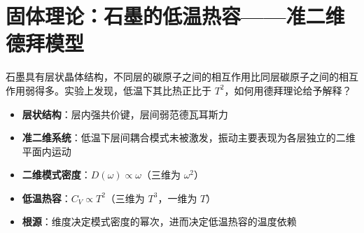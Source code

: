 \section{固体理论：石墨的低温热容——准二维德拜模型}
\label{sec:graphite-2d-debye}

\begin{modelbox}[题目：石墨低温比热与德拜理论]
石墨具有层状晶体结构，不同层的碳原子之间的相互作用比同层碳原子之间的相互作用弱得多。实验上发现，低温下其比热正比于 $T^2$，如何用德拜理论给予解释？
\end{modelbox}

\begin{tipbox}[考点快速分析]
\begin{itemize}
    \item \textbf{层状结构}：层内强共价键，层间弱范德瓦耳斯力
    \item \textbf{准二维系统}：低温下层间耦合模式未被激发，振动主要表现为各层独立的二维平面内运动
    \item \textbf{二维模式密度}：$D(\omega)\propto\omega$（三维为 $\omega^2$）
    \item \textbf{低温热容}：$C_V\propto T^2$（三维为 $T^3$，一维为 $T$）
    \item \textbf{根源}：维度决定模式密度的幂次，进而决定低温热容的温度依赖
\end{itemize}
\end{tipbox}


